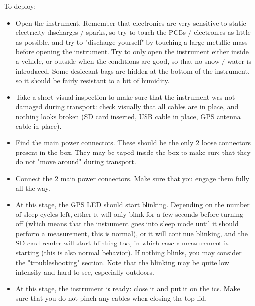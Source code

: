 \documentclass[pdftex,a4paper,12pt,twocolumn,fleqn,captions=tableheading]{scrartcl}
\begin{document}
To deploy:

\begin{itemize}
  \item Open the instrument. Remember that electronics are very sensitive to static electricity discharges / sparks, so try to touch the PCBs / electronics as little as possible, and try to "discharge yourself" by touching a large metallic mass before opening the instrument. Try to only open the instrument either inside a vehicle, or outside when the conditions are good, so that no snow / water is introduced. Some desiccant bags are hidden at the bottom of the instrument, so it should be fairly resistant to a bit of humidity.
  \item Take a short visual inspection to make sure that the instrument was not damaged during transport: check visually that all cables are in place, and nothing looks broken (SD card inserted, USB cable in place, GPS antenna cable in place).
  \item Find the main power connectors. These should be the only 2 loose connectors present in the box. They may be taped inside the box to make sure that they do not "move around" during transport.
  \item Connect the 2 main power connectors. Make sure that you engage them fully all the way.
  \item At this stage, the GPS LED should start blinking. Depending on the number of sleep cycles left, either it will only blink for a few seconds before turning off (which means that the instrument goes into sleep mode until it should perform a measurement, this is normal), or it will continue blinking, and the SD card reader will start blinking too, in which case a measurement is starting (this is also normal behavior). If nothing blinks, you may consider the "troubleshooting" section. Note that the blinking may be quite low intensity and hard to see, especially outdoors.
  \item At this stage, the instrument is ready: close it and put it on the ice. Make sure that you do not pinch any cables when closing the top lid.
\end{itemize}
\end{document}
